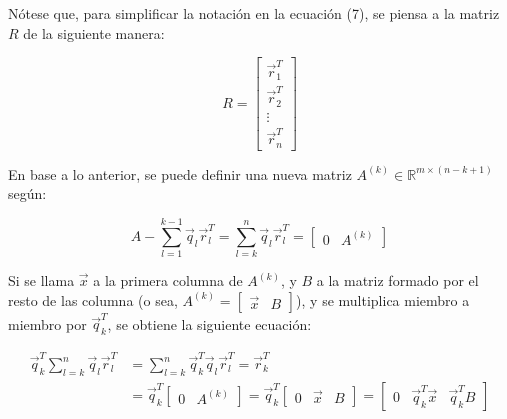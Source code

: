 \documentclass[spanish]{article}
\begin{document}
            Nótese que, para simplificar la notación en la ecuación (7), se piensa a la matriz $R$ de la siguiente manera:
            
            \begin{equation}
                R = 
                \begin{bmatrix}
                    \vec{r}^{T}_{1}\\
                    \vec{r}^{T}_{2}\\
                    \vdots\\
                    \vec{r}^{T}_{n}
                \end{bmatrix}
            \end{equation}
            
            En base a lo anterior, se puede definir una nueva matriz $A^{(k)} \in \mathbb{R}^{m \times (n - k + 1)}$ según:
            
            \begin{equation}
                A - \sum_{l = 1}^{k - 1} \vec{q}_{l} \vec{r}^{T}_{l} = \sum_{l = k}^{n} \vec{q}_{l} \vec{r}^{T}_{l} =
                \begin{bmatrix}
                    0 & A^{(k)}
                \end{bmatrix}
            \end{equation}
            
            Si se llama $\vec{x}$ a la primera columna de $A^{(k)}$, y $B$ a la matriz formado por el resto de las columna 
            (o sea, $A^{(k)} = \begin{bmatrix} \vec{x} & B\end{bmatrix}$), y se multiplica miembro a miembro por $\vec{q}^{T}_{k}$, se obtiene la siguiente ecuación:
            
            
            \begin{equation}
                \begin{split}
                    \vec{q}^{T}_{k} \sum_{l = k}^{n} \vec{q}_{l} \vec{r}^{T}_{l} 
                    &=
                    \sum_{l = k}^{n} \vec{q}^{T}_{k} \vec{q}_{l} \vec{r}^{T}_{l}
                    = \vec{r}^{T}_{k}
                    \\ 
                    &=
                    \vec{q}^{T}_{k} 
                    \begin{bmatrix}
                        0 & A^{(k)}
                    \end{bmatrix} 
                    = \vec{q}^{T}_{k}
                    \begin{bmatrix}
                        0 &\vec{x} & B
                    \end{bmatrix}
                    =
                    \begin{bmatrix}
                        0 & \vec{q}^{T}_{k} \vec{x} & \vec{q}^{T}_{k} B
                    \end{bmatrix}
                \end{split}
            \end{equation}
            
\end{document}
